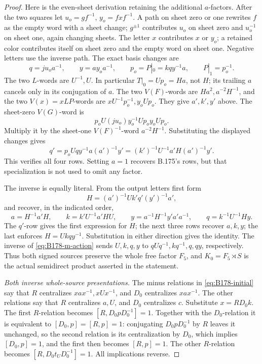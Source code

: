 \begin{proof}
Here is the even-sheet derivation retaining the additional \(a\)-factors.
After the two squares let \(u_o=gf^{-1}\), \(y_o=fxf^{-1}\).
A path on sheet zero or one rewrites \(f\) as the empty word with a
sheet change; \(g^{\pm1}\) contributes \(u_o\) on sheet zero and
\(u_o^{-1}\) on sheet one, again changing sheets. The letter \(x\)
contributes \(x\) or \(y_o\); a retained color contributes itself on
sheet zero and the empty word on sheet one. Negative letters use the
inverse path. The exact basis changes are
\[
 q=ju_oa^{-1},\qquad y=ay_oa^{-1},\qquad
 p_o=P|_0=kqy^{-1}a,\qquad P|_1=p_o^{-1}.
\]
The two \(L\)-words are \(U^{-1},U\). In particular
\(T|_0=Up_o=Ha\), not \(H\); its trailing \(a\) cancels only in
its conjugation of \(a\). The two \(V(F)\)-words are
\(Ha^2,a^{-2}H^{-1}\), and the two \(V(x)=xLP\)-words are
\(xU^{-1}p_o^{-1},y_oUp_o\). They give \(a',k',y'\) above.
The sheet-zero \(V(G)\)-word is
\[
                 p_oU(ju_o)y_o^{-1}Up_oy_oUp_o.
\]
Multiply it by the sheet-one \(V(F)^{-1}\)-word
\(a^{-2}H^{-1}\). Substituting the displayed changes gives
\[
 q'=p_oUqy^{-1}a(a')^{-1}y'
                      =(k')^{-1}U^{-1}a'H(a')^{-1}y'.
\]
This verifies all four rows. Setting \(a=1\) recovers B.175's rows,
but that specialization is not used to omit any factor.

The inverse is equally literal. From the output letters first form
\[
                   H=(a')^{-1}Uk'q'(y')^{-1}a',
\]
and recover, in the indicated order,
\begin{equation}\label{eq:B178-V-inverse}
 a=H^{-1}a'H,\qquad k=k'U^{-1}a'HU,\qquad
 y=a^{-1}H^{-1}y'a'a^{-1},\qquad q=k^{-1}U^{-1}Hy.
\end{equation}
The \(q'\)-row gives the first expression for \(H\); the next three
rows recover \(a,k,y\); the last enforces \(H=Ukqy^{-1}\).
Substitution in either direction gives the identity. The inverse of
\eqref{eq:B178-m-action} sends \(U,k,q,y\) to
\(qUq^{-1},kq^{-1},q,qy\), respectively. Thus both signed sources
preserve the whole free factor \(F_5\), and \(K_0=F_5\rtimes S\)
is the actual semidirect product asserted in the statement.

\emph{Both inverse whole-source presentations.}
The minus relations in \eqref{eq:B178-initial} say that \(R\)
centralizes \(xax^{-1},xUx^{-1}\), and \(D_0\) centralizes
\(xax^{-1}\). The other relations say that \(R\) centralizes
\(a,U\), and \(D_0\) centralizes \(c\).
Substitute \(x=RD_0k\). The first \(R\)-relation becomes
\([R,D_0pD_0^{-1}]=1\). Together with the \(D_0\)-relation it is
equivalent to \([D_0,p]=[R,p]=1\): conjugating \(D_0pD_0^{-1}\)
by \(R\) leaves it unchanged, so the second relation is its
centralization by \(D_0\), which implies \([D_0,p]=1\), and the
first then becomes \([R,p]=1\). The other \(R\)-relation becomes
\([R,D_0t_UD_0^{-1}]=1\). All implications reverse.


\end{proof}

